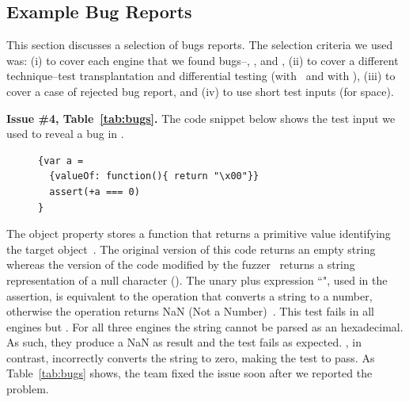 \documentclass[10pt,conference,anonymous]{IEEEtran}
\begin{document}
\subsection{Example Bug Reports}

This section discusses a selection of bugs reports. The selection
criteria we used was: (i) to cover each engine that we found
bugs--\chakra, \jsc, and \veight, (ii) to cover a different
technique--test transplantation and differential testing (with
\radamsa\ and with \quickfuzz), (iii) to cover a case of rejected bug
report, and (iv) to use short test inputs (for space).


\sloppy
\vspace{1ex}\noindent\textbf{Issue \#4, Table~\ref{tab:bugs}.} The
code snippet below shows the test input we used to reveal a bug in
\chakra.

\begin{figure}[h!]
  \centering
  \scriptsize
  \begin{lstlisting}
{var a =
  {valueOf: function(){ return "\x00"}}
  assert(+a === 0)
}
  \end{lstlisting}
  \normalsize
\end{figure}

The object property  stores a function that returns a
primitive value identifying the target object~\cite{valueof}. The
original version of this code returns an empty string whereas the
version of the code modified by the \radamsa{} fuzzer~\cite{radamsa}
returns a string representation of a null character (). The unary plus expression ``", used in the
assertion, is equivalent to the operation
 that converts a string to a number,
otherwise the operation returns NaN (Not a
Number)~\cite{unary-plus}. This test fails in all engines but
\chakra{}. For all three engines the string cannot be parsed as an
hexadecimal. As such, they produce a NaN as result and the test fails
as expected. \chakra{}, in contrast, incorrectly converts the string
to zero, making the test to pass. As Table~\ref{tab:bugs} shows, the
\chakra{} team fixed the issue soon after we reported the problem.
\end{document}
